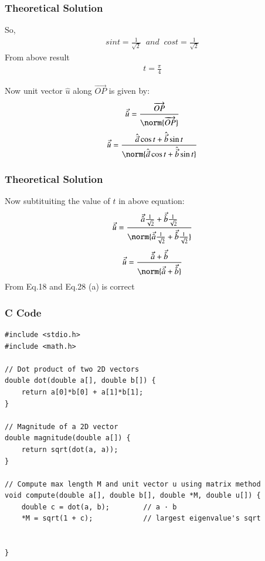 \documentclass{beamer}
\begin{document}
\begin{frame}
\frametitle{Theoretical Solution}
    So,
\begin{align}
    sint=\frac{1}{\sqrt{2}}\;\;and\;\; cost=\frac{1}{\sqrt{2}}
\end{align}
From above result
\begin{align}
    t=\frac{\pi}{4}
\end{align}

Now unit vector $\hat{u}$ along $\overrightarrow{OP}$ is given by:
\begin{align}
    \Vec{{\hat{u}}}=\frac{\overrightarrow{OP}}{\norm{\overrightarrow{OP}}}
\end{align}
\begin{align}
\Vec{\hat{u}}=\frac{\hat{\vec{a}}\cos{t} + \hat{\vec{b}}\sin{t}}{\norm{\hat{\vec{a}}\cos{t} + \hat{\vec{b}}\sin{t}}}
\end{align}

\end{frame}
\begin{frame}
\frametitle{Theoretical Solution}
    Now subtituiting the value of $t$ in above equation:
\begin{align}
    \Vec{\hat{u}}=\frac{\Vec{\hat{a}}\frac{1}{\sqrt{2}} + \Vec{\hat{b}}\frac{1}{\sqrt{2}}}{\norm{\Vec{\hat{a}}\frac{1}{\sqrt{2}} + \Vec{\hat{b}}\frac{1}{\sqrt{2}}}}
\end{align}
\begin{align}
    \Vec{\hat{u}}=\frac{\Vec{\hat{a}} + \Vec{\hat{b}}}{\norm{\Vec{\hat{a}} + \Vec{\hat{b}}}}
\end{align}
From Eq.18 and Eq.28 (a) is correct 
\end{frame}




\begin{frame}[fragile]
    \frametitle{C Code  }

    \begin{lstlisting}
#include <stdio.h>
#include <math.h>

// Dot product of two 2D vectors
double dot(double a[], double b[]) {
    return a[0]*b[0] + a[1]*b[1];
}

// Magnitude of a 2D vector
double magnitude(double a[]) {
    return sqrt(dot(a, a));
}

// Compute max length M and unit vector u using matrix method
void compute(double a[], double b[], double *M, double u[]) {
    double c = dot(a, b);        // a · b
    *M = sqrt(1 + c);            // largest eigenvalue's sqrt

   
}



    \end{lstlisting}
\end{frame}
\end{document}
